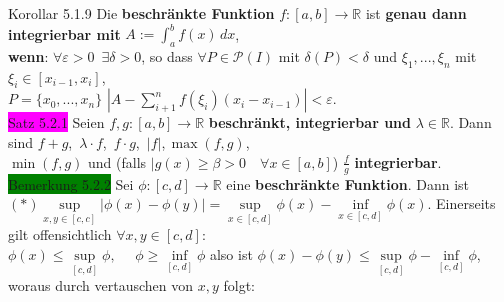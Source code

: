 \documentclass[10pt]{article}
\begin{document}
\colorbox{BurntOrange}{Korollar 5.1.9} Die \textbf{beschränkte Funktion} 
                \textcolor{NavyBlue}{$f:[a,b]\longrightarrow\mathbb{R}$} ist 
                \textbf{genau dann integrierbar mit}
                \textcolor{NavyBlue}{$A:=\int_a^bf(x)\,dx$}, \\
        \indent \textbf{wenn}: 
                \textcolor{NavyBlue}{$\forall\varepsilon>0\enspace\exists\delta>0$}, so dass 
                \textcolor{NavyBlue}{$\forall P\in\mathcal{P}(I)$} mit 
                \textcolor{NavyBlue}{$\delta(P)<\delta$}
                und \textcolor{NavyBlue}{$\xi_1,...,\xi_n$} mit 
                \textcolor{NavyBlue}{$\xi_i\in[x_{i-1},x_i]$},\,\\
        \indent \textcolor{NavyBlue}{$P=\{x_0,...,x_n\}$} 
                \textcolor{NavyBlue}{$|A-\sum_{i+1}^nf(\xi_i)(x_i-x_{i-1})|<\varepsilon$}. \\
\colorbox{magenta}{Satz 5.2.1} Seien \textcolor{NavyBlue}{$f,g:[a,b]\longrightarrow\mathbb{R}$} 
                \textbf{beschränkt, integrierbar und} 
                \textcolor{NavyBlue}{$\lambda\in\mathbb{R}$}. 
                Dann sind \textcolor{NavyBlue}{$f+g$},\,
                \textcolor{NavyBlue}{$\lambda\cdot f$},\,
                \textcolor{NavyBlue}{$f\cdot g$},\,
                \textcolor{NavyBlue}{$|f|$},\,\textcolor{NavyBlue}{$\max(f,g)$},\\
        \indent \textcolor{NavyBlue}{$\min(f,g)$} und (falls 
                \textcolor{NavyBlue}{$|g(x)\geqslant\beta>0\quad\forall x\in[a,b]$})
                \textcolor{NavyBlue}{$\frac{f}{g}$}
                \textbf{integrierbar}.\\
\colorbox{green}{Bemerkung 5.2.2} Sei 
                \textcolor{NavyBlue}{$\phi:[c,d]\longrightarrow\mathbb{R}$} 
                eine \textbf{beschränkte Funktion}. Dann ist \\
        \indent $(*)$\textcolor{NavyBlue}{$\sup\limits_{x,y\in[c,c]}|\phi(x)-\phi(y)|
                =\sup\limits_{x\in[c,d]}\phi(x)-\inf\limits_{x\in[c,d]}\phi(x)$}.
                Einerseits gilt offensichtlich 
                \textcolor{NavyBlue}{$\forall x,y\in[c,d]$}: \\
        \indent \textcolor{NavyBlue}{$\phi(x)\leqslant\sup\limits_{[c,d]}\phi,$}
                \textcolor{NavyBlue}{$\quad\phi\geqslant\inf\limits_{[c,d]}\phi$}
                also ist \textcolor{NavyBlue}{
                $\phi(x)-\phi(y)\leqslant\sup\limits_{[c,d]}\phi-\inf\limits_{[c,d]}\phi$}, 
                woraus durch vertauschen von \textcolor{NavyBlue}{$x,y$} folgt: \\
\end{document}

